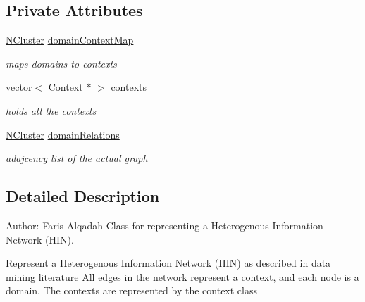 \subsection*{Private Attributes}
\begin{DoxyCompactItemize}
\item 
\hypertarget{class_relation_graph_a19682ef9117675a560dc472ccd8ed71e}{
\hyperlink{class_n_cluster}{NCluster} \hyperlink{class_relation_graph_a19682ef9117675a560dc472ccd8ed71e}{domainContextMap}}
\label{class_relation_graph_a19682ef9117675a560dc472ccd8ed71e}

\begin{DoxyCompactList}\small\item\em maps domains to contexts \item\end{DoxyCompactList}\item 
\hypertarget{class_relation_graph_a5332e76684098cd29d56cb4bd61ad006}{
vector$<$ \hyperlink{class_context}{Context} $\ast$ $>$ \hyperlink{class_relation_graph_a5332e76684098cd29d56cb4bd61ad006}{contexts}}
\label{class_relation_graph_a5332e76684098cd29d56cb4bd61ad006}

\begin{DoxyCompactList}\small\item\em holds all the contexts \item\end{DoxyCompactList}\item 
\hypertarget{class_relation_graph_ae9f10cd7d1c80a5c6860efb3155a3737}{
\hyperlink{class_n_cluster}{NCluster} \hyperlink{class_relation_graph_ae9f10cd7d1c80a5c6860efb3155a3737}{domainRelations}}
\label{class_relation_graph_ae9f10cd7d1c80a5c6860efb3155a3737}

\begin{DoxyCompactList}\small\item\em adajcency list of the actual graph \item\end{DoxyCompactList}\end{DoxyCompactItemize}


\subsection{Detailed Description}
Author: Faris Alqadah Class for representing a Heterogenous Information Network (HIN).

Represent a Heterogenous Information Network (HIN) as described in data mining literature All edges in the network represent a context, and each node is a domain. The contexts are represented by the context class

